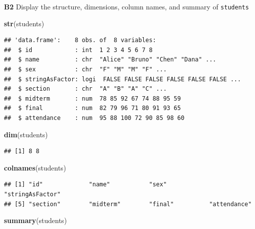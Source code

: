 \documentclass[
]{article}
\newenvironment{Shaded}{\begin{snugshade}}{\end{snugshade}}
\newcommand{\FunctionTok}[1]{\textcolor[rgb]{0.13,0.29,0.53}{\textbf{#1}}}
\newcommand{\NormalTok}[1]{#1}
\begin{document}
\textbf{B2} Display the structure, dimensions, column names, and summary
of \texttt{students}

\begin{Shaded}
\begin{Highlighting}[]
\FunctionTok{str}\NormalTok{(students)}
\end{Highlighting}
\end{Shaded}

\begin{verbatim}
## 'data.frame':    8 obs. of  8 variables:
##  $ id            : int  1 2 3 4 5 6 7 8
##  $ name          : chr  "Alice" "Bruno" "Chen" "Dana" ...
##  $ sex           : chr  "F" "M" "M" "F" ...
##  $ stringAsFactor: logi  FALSE FALSE FALSE FALSE FALSE FALSE ...
##  $ section       : chr  "A" "B" "A" "C" ...
##  $ midterm       : num  78 85 92 67 74 88 95 59
##  $ final         : num  82 79 96 71 80 91 93 65
##  $ attendance    : num  95 88 100 72 90 85 98 60
\end{verbatim}

\begin{Shaded}
\begin{Highlighting}[]
\FunctionTok{dim}\NormalTok{(students)}
\end{Highlighting}
\end{Shaded}

\begin{verbatim}
## [1] 8 8
\end{verbatim}

\begin{Shaded}
\begin{Highlighting}[]
\FunctionTok{colnames}\NormalTok{(students)}
\end{Highlighting}
\end{Shaded}

\begin{verbatim}
## [1] "id"             "name"           "sex"            "stringAsFactor"
## [5] "section"        "midterm"        "final"          "attendance"
\end{verbatim}

\begin{Shaded}
\begin{Highlighting}[]
\FunctionTok{summary}\NormalTok{(students)}
\end{Highlighting}
\end{Shaded}
\end{document}
